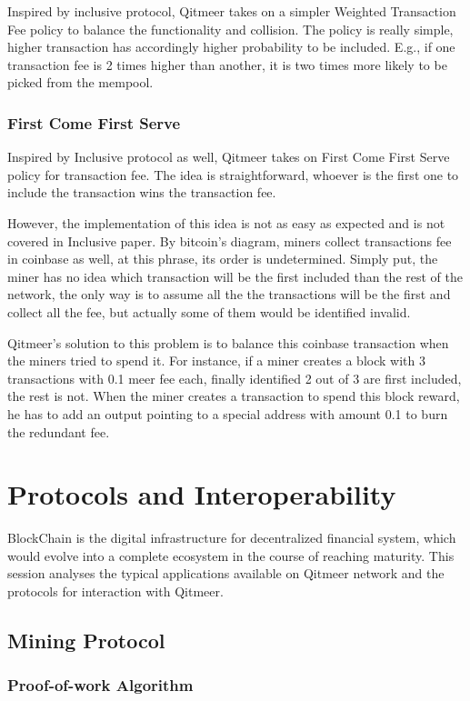 \documentclass[a4paper,11pt]{article}
\begin{document}
Inspired by inclusive protocol, Qitmeer takes on a simpler Weighted Transaction Fee policy to balance the functionality and collision. The policy is really simple, higher transaction has accordingly higher probability to be included. E.g., if one transaction fee is 2 times higher than another, it is two times more likely to be picked from the mempool.

\subsubsection{First Come First Serve}
Inspired by Inclusive protocol as well, Qitmeer takes on First Come First Serve policy for transaction fee. The idea is straightforward, whoever is the first one to include the transaction wins the transaction fee.

However, the implementation of this idea is not as easy as expected and is not covered in Inclusive paper. By bitcoin's diagram, miners collect transactions fee in coinbase as well, at this phrase, its order is undetermined. Simply put, the miner has no idea which transaction will be the first included than the rest of the network, the only way is to assume all the the transactions will be the first and collect all the fee, but actually some of them would be identified invalid.

Qitmeer's solution to this problem is to balance this coinbase transaction when the miners tried to spend it. For instance, if a miner creates a block with 3 transactions with 0.1 meer fee each, finally identified 2 out of 3 are first included, the rest is not. When the miner creates a transaction to spend this block reward, he has to add an output pointing to a special address with amount 0.1 to burn the redundant fee.

\section{Protocols and Interoperability}
BlockChain is the digital infrastructure for decentralized financial system, which would evolve into a complete ecosystem in the course of reaching maturity. This session analyses the typical applications available on  Qitmeer network and the protocols for interaction with Qitmeer. 

\subsection{Mining Protocol}
\subsubsection{Proof-of-work Algorithm}
\end{document}
